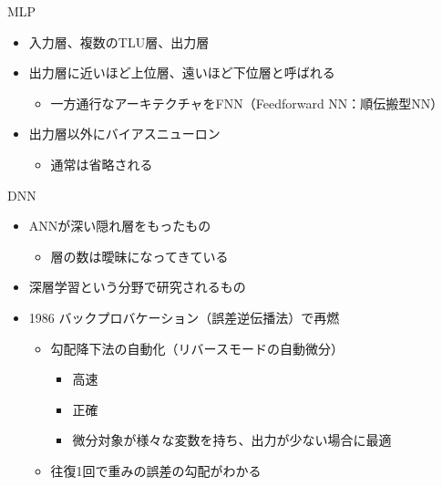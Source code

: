 \documentclass[aspectratio=169, dvipdfmx, 14pt, xcolor={svgnames,dvipsnames}]{beamer}
\def\tightlist{\itemsep1pt\parskip0pt\parsep0pt}
\begin{document}

\begin{frame}{\quad MLP}
  \begin{itemize}
    \tightlist
    \item
          入力層、複数のTLU層、出力層
    \item
          出力層に近いほど上位層、遠いほど下位層と呼ばれる

          \begin{itemize}
            \tightlist
            \item
                  一方通行なアーキテクチャをFNN（Feedforward NN：順伝搬型NN）
          \end{itemize}
    \item
          出力層以外にバイアスニューロン

          \begin{itemize}
            \tightlist
            \item
                  通常は省略される
          \end{itemize}
  \end{itemize}
\end{frame}


\begin{frame}{\quad DNN}
  \begin{itemize}
    \item
          ANNが深い隠れ層をもったもの

          \begin{itemize}
            \tightlist
            \item
                  層の数は曖昧になってきている
          \end{itemize}
    \item
          深層学習という分野で研究されるもの
    \item
          1986 \alert{バックプロバケーション（誤差逆伝播法）}で再燃

          \begin{itemize}
            \tightlist
            \item
                  勾配降下法の自動化（リバースモードの自動微分）

                  \begin{itemize}
                    \tightlist
                    \item
                          高速
                    \item
                          正確
                    \item
                          微分対象が様々な変数を持ち、出力が少ない場合に最適
                  \end{itemize}
            \item
                  往復1回で重みの誤差の勾配がわかる
          \end{itemize}
  \end{itemize}
\end{frame}
\end{document}
